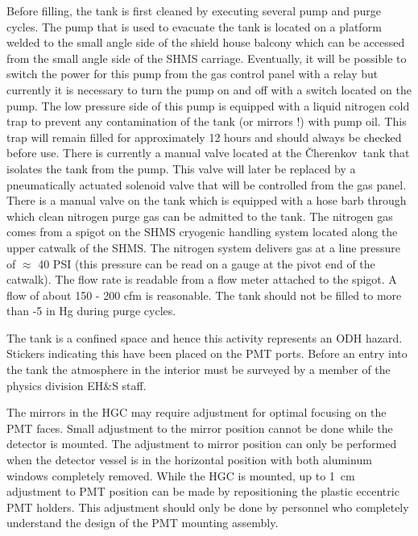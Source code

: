 \documentclass[12pt]{article}
\newcommand{\Cerenkov}{\v{C}herenkov~}
\begin{document}
{Before filling, the tank is first cleaned by executing several pump
and purge cycles. The pump that is used to evacuate the tank is located on a
platform welded to the small angle side of the shield house balcony
which can be accessed from the small angle side of the SHMS carriage.
Eventually, it will be possible to switch the power for this pump
from the gas control panel with a relay but currently it
is necessary to turn the pump on and off with a switch located on the pump.
The low pressure side of this pump is equipped with a liquid nitrogen
cold trap to prevent any contamination of the tank (or mirrors !)
with pump oil. This trap will remain filled for approximately
12 hours and should always be checked before use. There is currently
a manual valve located at the \Cerenkov tank that isolates the tank from
the pump.  This valve will later be replaced by a pneumatically actuated
solenoid valve that will be controlled from the gas panel.
There is a manual valve on the tank which is equipped with a hose
barb through which clean nitrogen purge gas can be admitted to the tank.
The nitrogen gas comes from a spigot on the SHMS cryogenic handling system
located along the upper catwalk of the SHMS. The nitrogen system
delivers gas at a line pressure of $\approx$ 40 PSI (this pressure can
be read on a gauge at the pivot end of the catwalk). The flow
rate is readable from a flow meter attached to the spigot. A flow of
about 150 - 200 cfm is reasonable. The tank should not be filled to
more than -5 in Hg during purge cycles.

}



The tank is a confined space and hence this activity represents an ODH hazard. Stickers indicating this have been placed on the PMT ports. Before an entry into the tank the atmosphere in the interior must be surveyed by a member of the physics division EH$\&$S staff.

The mirrors in the HGC may require adjustment for optimal focusing on the PMT faces. Small adjustment to the mirror position cannot be done while the detector is mounted. The adjustment to mirror position can only be performed when the detector vessel is in the horizontal position with both aluminum windows completely removed. While the HGC is mounted, up to 1~cm adjustment to PMT position can be made by repositioning the plastic eccentric PMT holders. This adjustment should only be done by personnel who completely understand the design of the PMT mounting assembly. 

\end{document}
